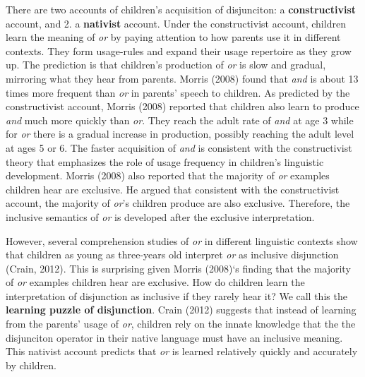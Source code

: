\documentclass[10pt, letterpaper]{article}
\begin{document}
There are two accounts of children's acquisition of disjunciton: a
\textbf{constructivist} account, and 2. a \textbf{nativist} account.
Under the constructivist account, children learn the meaning of
\emph{or} by paying attention to how parents use it in different
contexts. They form usage-rules and expand their usage repertoire as
they grow up. The prediction is that children's production of \emph{or}
is slow and gradual, mirroring what they hear from parents. Morris
(2008) found that \emph{and} is about 13 times more frequent than
\emph{or} in parents' speech to children. As predicted by the
constructivist account, Morris (2008) reported that children also learn
to produce \emph{and} much more quickly than \emph{or}. They reach the
adult rate of \emph{and} at age 3 while for \emph{or} there is a gradual
increase in production, possibly reaching the adult level at ages 5 or
6. The faster acquisition of \emph{and} is consistent with the
constructivist theory that emphasizes the role of usage frequency in
children's linguistic development. Morris (2008) also reported that the
majority of \emph{or} examples children hear are exclusive. He argued
that consistent with the constructivist account, the majority of
\emph{or}'s children produce are also exclusive. Therefore, the
inclusive semantics of \emph{or} is developed after the exclusive
interpretation.

However, several comprehension studies of \emph{or} in different
linguistic contexts show that children as young as three-years old
interpret \emph{or} as inclusive disjunction (Crain, 2012). This is
surprising given Morris (2008)`s finding that the majority of \emph{or}
examples children hear are exclusive. How do children learn the
interpretation of disjunction as inclusive if they rarely hear it? We
call this the \textbf{learning puzzle of disjunction}. Crain (2012)
suggests that instead of learning from the parents' usage of \emph{or},
children rely on the innate knowledge that the the disjunciton operator
in their native language must have an inclusive meaning. This nativist
account predicts that \emph{or} is learned relatively quickly and
accurately by children.
\end{document}
